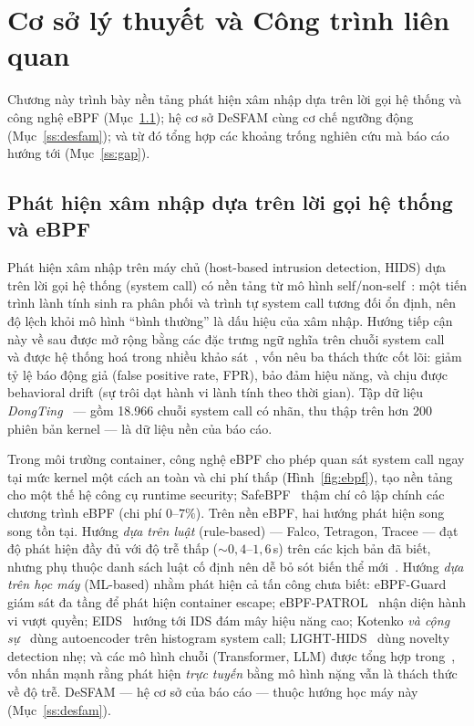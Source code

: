 \section{Cơ sở lý thuyết và Công trình liên quan}\label{sec:related}
Chương này trình bày nền tảng phát hiện xâm nhập dựa trên lời gọi hệ thống và công nghệ eBPF (Mục~\ref{ss:hids}); hệ cơ sở DeSFAM cùng cơ chế ngưỡng động (Mục~\ref{ss:desfam}); và từ đó tổng hợp các khoảng trống nghiên cứu mà báo cáo hướng tới (Mục~\ref{ss:gap}).

\subsection{Phát hiện xâm nhập dựa trên lời gọi hệ thống và eBPF}\label{ss:hids}
Phát hiện xâm nhập trên máy chủ (host-based intrusion detection, HIDS) dựa trên lời gọi hệ thống (system call) có nền tảng từ mô hình self/non-self~\cite{forrest1996sense}: một tiến trình lành tính sinh ra phân phối và trình tự system call tương đối ổn định, nên độ lệch khỏi mô hình ``bình thường'' là dấu hiệu của xâm nhập. Hướng tiếp cận này về sau được mở rộng bằng các đặc trưng ngữ nghĩa trên chuỗi system call~\cite{creech2014semantic} và được hệ thống hoá trong nhiều khảo sát~\cite{liu2018hids,bridges2019hostdata}, vốn nêu ba thách thức cốt lõi: giảm tỷ lệ báo động giả (false positive rate, FPR), bảo đảm hiệu năng, và chịu được behavioral drift (sự trôi dạt hành vi lành tính theo thời gian). Tập dữ liệu \textit{DongTing}~\cite{dongting2023} — gồm 18.966 chuỗi system call có nhãn, thu thập trên hơn 200 phiên bản kernel — là dữ liệu nền của báo cáo.

Trong môi trường container, công nghệ eBPF cho phép quan sát system call ngay tại mức kernel một cách an toàn và chi phí thấp (Hình~\ref{fig:ebpf}), tạo nền tảng cho một thế hệ công cụ runtime security; SafeBPF~\cite{safebpf2024} thậm chí cô lập chính các chương trình eBPF (chi phí $0$--$7\%$). Trên nền eBPF, hai hướng phát hiện song song tồn tại. Hướng \textit{dựa trên luật} (rule-based) — Falco, Tetragon, Tracee — đạt độ phát hiện đầy đủ với độ trễ thấp ($\sim 0{,}4$--$1{,}6$\,s) trên các kịch bản đã biết, nhưng phụ thuộc danh sách luật cố định nên dễ bỏ sót biến thể mới~\cite{syairozi2025ebpfcompare}. Hướng \textit{dựa trên học máy} (ML-based) nhằm phát hiện cả tấn công chưa biết: eBPF-Guard~\cite{ebpfguard2026} giám sát đa tầng để phát hiện container escape; eBPF-PATROL~\cite{ebpfpatrol2025} nhận diện hành vi vượt quyền; EIDS~\cite{hu2026eids} hướng tới IDS đám mây hiệu năng cao; Kotenko \textit{và cộng sự}~\cite{kotenko2025containerae} dùng autoencoder trên histogram system call; LIGHT-HIDS~\cite{lighthids2025} dùng novelty detection nhẹ; và các mô hình chuỗi (Transformer, LLM) được tổng hợp trong~\cite{translmidssurvey}, vốn nhấn mạnh rằng phát hiện \textit{trực tuyến} bằng mô hình nặng vẫn là thách thức về độ trễ. DeSFAM — hệ cơ sở của báo cáo — thuộc hướng học máy này (Mục~\ref{ss:desfam}).

